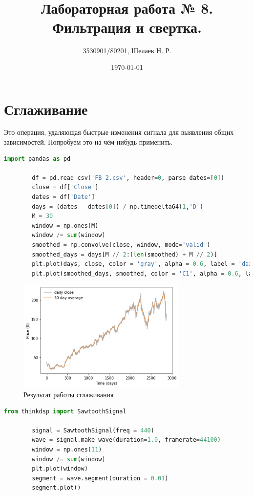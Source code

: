 \documentclass[a4paper, 12pt]{report}
\author{3530901/80201, Шелаев Н. Р.}
\title{Лабораторная работа № 8. Фильтрация и свертка.}
\date{\today}
\begin{document}
	\maketitle
	\tableofcontents
	\listoffigures
	\lstlistoflistings

	\chapter{Сглаживание}
	Это операция, удаляющая быстрые изменения сигнала для выявления общих зависимостей.
	Попробуем это на чём-нибудь применить.
	\begin{lstlisting}[language=Python,caption=Воспользуемся акциями Facebook]
		import pandas as pd

		df = pd.read_csv('FB_2.csv', header=0, parse_dates=[0])
		close = df['Close']
		dates = df['Date']
		days = (dates - dates[0]) / np.timedelta64(1,'D')
		M = 30
		window = np.ones(M)
		window /= sum(window)
		smoothed = np.convolve(close, window, mode='valid')
		smoothed_days = days[M // 2:(len(smoothed) + M // 2)]
		plt.plot(days, close, color = 'gray', alpha = 0.6, label = 'daily close')
		plt.plot(smoothed_days, smoothed, color = 'C1', alpha = 0.6, label = '30 day average')
	\end{lstlisting}
	\begin{figure}[H]
		\centering
		\includegraphics[width=0.75\textwidth]{test1.png}
		\caption{Результат работы сглаживания}
		\label{fig:test1}
	\end{figure}
	\begin{lstlisting}[language=Python,caption=А теперь реальный сигнал]
		from thinkdsp import SawtoothSignal

		signal = SawtoothSignal(freq = 440)
		wave = signal.make_wave(duration=1.0, framerate=44100)
		window = np.ones(11)
		window /= sum(window)
		plt.plot(window)
		segment = wave.segment(duration = 0.01)
		segment.plot()
	\end{lstlisting}
\end{document}
